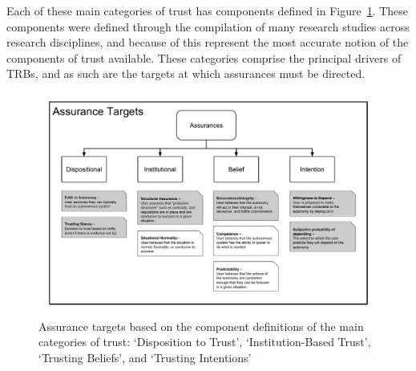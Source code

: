         Each of these main categories of trust has components defined in Figure~\ref{fig:Assurance_classes}. These components were defined through the compilation of many research studies across research disciplines, and because of this represent the most accurate notion of the components of trust available. These categories comprise the principal drivers of TRBs, and as such are the targets at which assurances must be directed.

        \begin{figure}
            \includegraphics[width=8in]{Figures/Assurances.pdf}%
            \caption{Assurance targets based on the component definitions of the main categories of trust: `Disposition to Trust', `Institution-Based Trust', `Trusting Beliefs', and `Trusting Intentions'}
            \label{fig:Assurance_classes}
        \end{figure}
